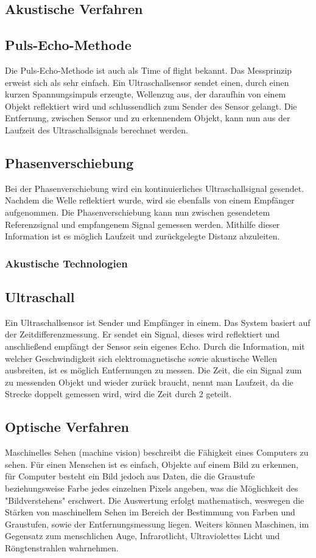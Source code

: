     \subsection{Akustische Verfahren}
    \subsection*{Puls-Echo-Methode}
    Die Puls-Echo-Methode ist auch als Time of flight bekannt.
    Das Messprinzip erweist sich als sehr einfach. Ein Ultraschallsensor sendet einen, durch einen kurzen Spannungsimpuls erzeugte, Wellenzug aus, der daraufhin von einem Objekt reflektiert wird und schlussendlich zum Sender des Sensor gelangt. Die Entfernung, zwischen Sensor und zu erkennendem Objekt, kann nun aus der Laufzeit des Ultraschallsignals berechnet werden. \cite{akustischeverfahren}
    \subsection*{Phasenverschiebung}
    Bei der Phasenverschiebung wird ein kontinuierliches Ultraschallsignal gesendet. Nachdem die Welle reflektiert wurde, wird sie ebenfalls von einem Empfänger aufgenommen. Die Phasenverschiebung kann nun zwischen gesendetem Referenzsignal und empfangenem Signal gemessen werden. Mithilfe dieser Information ist es möglich Laufzeit und zurückgelegte Distanz abzuleiten. \cite{akustischeverfahren}

    \subsubsection{Akustische Technologien}
    \subsection*{Ultraschall}
    Ein Ultraschallsensor ist Sender und Empfänger in einem. Das System basiert auf der Zeitdifferenzmessung. Er sendet ein Signal, dieses wird reflektiert und anschließend empfängt der Sensor sein eigenes Echo.
    Durch die Information, mit welcher Geschwindigkeit sich elektromagnetische sowie akustische Wellen ausbreiten, ist es möglich Entfernungen zu messen. Die Zeit, die ein Signal zum zu messenden Objekt und wieder zurück braucht, nennt man Laufzeit, da die Strecke doppelt gemessen wird, wird die Zeit durch 2 geteilt.

    \subsection{Optische Verfahren}
    Maschinelles Sehen (machine vision) beschreibt die Fähigkeit eines Computers zu sehen. 
    Für einen Menschen ist es einfach, Objekte auf einem Bild zu erkennen, für Computer besteht ein Bild jedoch aus Daten, die die Graustufe beziehungsweise Farbe jedes einzelnen Pixels angeben, was die Möglichkeit des "Bildverstehens" erschwert.
    Die Auswertung erfolgt mathematisch, weswegen die Stärken von maschinellem Sehen im Bereich der Bestimmung von Farben und Graustufen, sowie der Entfernungsmessung liegen. Weiters können Maschinen, im Gegensatz zum menschlichen Auge, Infrarotlicht, Ultraviolettes Licht und Röngtenstrahlen wahrnehmen. \cite{machinevision} \cite{machinevision2}

